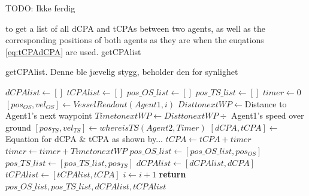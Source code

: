 

TODO: Ikke ferdig


to get a list of all dCPA and tCPAs between two agents, as well as the corresponding positions of both
agents as they are when the euqations \ref{eq:tCPAdCPA} are used. getCPAlist 

\begin{algorithm}[t]
    \caption{getCPAlist. Denne ble jævelig stygg, beholder den for synlighet}\label{alg:getCPAlist}
    \begin{algorithmic}[1]
    \State $dCPAlist \gets []$
    \State $tCPAlist \gets []$
    \State $pos\_OS\_list \gets []$
    \State $pos\_TS\_list \gets []$
    \State $timer \gets 0$ 
        \State $[pos_{OS}, vel_{OS}] \gets VesselReadout(Agent1, i)$ 
        \State $DisttonextWP \gets $Distance to Agent1's next waypoint
        \State $TimetonextWP \gets DisttonextWP \div$ Agent1's speed over ground
        \State $[pos_{TS}, vel_{TS}] \gets whereisTS(Agent2, Timer)$ 
        \State $[dCPA, tCPA] \gets$ Equation for dCPA \& tCPA as shown by...
        \State $tCPA \gets tCPA + timer$ 
        \State $timer \gets timer + TimetonextWP$
        \State $pos\_OS\_list \gets [pos\_OS\_list, pos_{OS}]$ 
        \State $pos\_TS\_list \gets [pos\_TS\_list, pos_{TS}]$
        \State $dCPAlist \gets [dCPAlist, dCPA]$ 
        \State $tCPAlist \gets [tCPAlist, tCPA]$ 
        \State $i \gets i + 1$
    \EndFor
    \State \textbf{return} $pos\_OS\_list, pos\_TS\_list, dCPAlist, tCPAlist$
    \end{algorithmic}
\end{algorithm}

